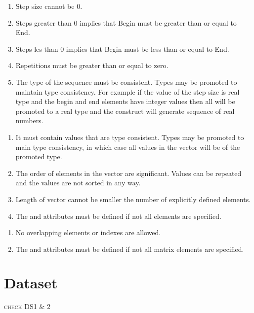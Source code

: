 \begin{valrules}

\begin{enumerate}
\item Step size cannot be 0.
\item Steps greater than 0 implies that Begin must be greater than or equal to End.
\item Steps les than 0 implies that Begin must be less than or equal
  to End.
\item Repetitions must be greater than or equal to zero.
\item The type of the sequence must be consistent. Types may be
  promoted to maintain type consistency. For example if the value of
  the step size is real type and the begin and end elements have
  integer values then all will be promoted to a real type and the
  construct will generate sequence of real numbers.
\end{enumerate}


\begin{enumerate}
\item It must contain values that are type
consistent. Types may be promoted to main type consistency, in which
case all values in the vector will be of the promoted type.
\item The order of elements in the vector are significant. Values can
  be repeated and the values are not sorted in any way.
\item Length of vector cannot be smaller the number of explicitly  defined elements.
\item The  and  attributes must be defined if not all elements are specified.
\end{enumerate}

\begin{enumerate}
\item No overlapping elements or indexes are allowed.
\item The  and  attributes must be defined if not all matrix elements are specified.
\end{enumerate}
\end{valrules}

\section{Dataset}
{\color{red} \scshape{check DS1 \& 2}}

